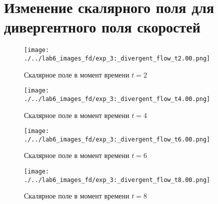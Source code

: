\chapter{Изменение скалярного поля  для дивергентного поля скоростей}
\label{app:div_df}

\begin{figure}[h]
	\centering
	\texttt{[image: ./../lab6\_images\_fd/exp\_3:\_divergent\_flow\_t2.00.png]}
	\caption{Скалярное поле в момент времени $t=2$ }
\end{figure}
\begin{figure}[h]
	\centering
	\texttt{[image: ./../lab6\_images\_fd/exp\_3:\_divergent\_flow\_t4.00.png]}
	\caption{Скалярное поле в момент времени $t=4$}
\end{figure}
\begin{figure}[h]
	\centering
	\texttt{[image: ./../lab6\_images\_fd/exp\_3:\_divergent\_flow\_t6.00.png]}
	\caption{Скалярное поле в момент времени $t=6$ }
\end{figure}
\begin{figure}[h]
	\centering
	\texttt{[image: ./../lab6\_images\_fd/exp\_3:\_divergent\_flow\_t8.00.png]}
	\caption{Скалярное поле в момент времени $t=8$}
\end{figure}